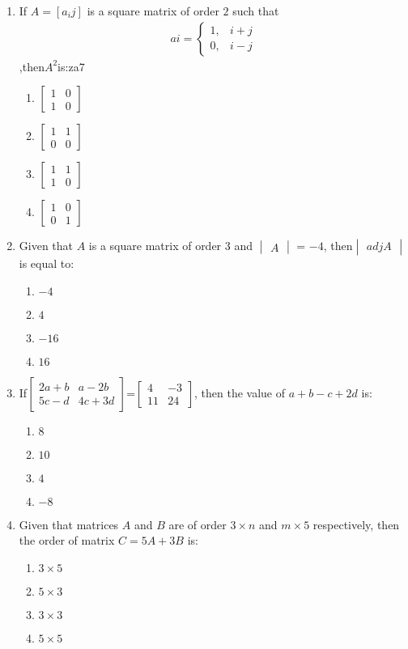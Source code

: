 \documentclass{article}
\providecommand{\myvec}[1]{\begin{bmatrix}#1\end{bmatrix}}
\providecommand{\mydet}[1]{\begin{vmatrix}#1\end{vmatrix}}
\begin{document}
\begin{enumerate}
    \item If $A = [a_{i}{j}]$ is a square matrix of order $2$ such that 
	    \begin{align*}
		    a{i}=\begin{cases}
			    1, &  i + j \\
			    0, &  i - j
		    \end{cases}
	    \end{align*},then$A^2$is:za7

    \begin{enumerate}
        \item $\myvec{1&0\\1 &0}$
        \item $ \myvec{1&1\\0&0}$
        \item $\myvec{1&1\\1&0}$
        \item $\myvec{1&0\\0&1}$
    \end{enumerate}

    \item Given that $A$ is a square matrix of order $3$ and $\mydet{A}$ = $-4$, then$\mydet{adjA}$ is equal to:
    \begin{enumerate}
        \item $-4$
        \item $4$
        \item $-16$
        \item $16$
    \end{enumerate}
    
    \item If$\myvec{2a+b & a-2b \\5c-d & 4c+3d}$=$\myvec{4&-3 \\11&24}$,
    then the value of $a + b - c + 2d$ is:
    \begin{enumerate}
        \item  $8$
        \item $10$
        \item $4$ 
        \item $-8$
    \end{enumerate}

  \item Given that matrices $A$ and $B$ are of order $3 \times n$ and $m \times 5$ respectively, then the order of matrix $C = 5A + 3B$ is:
    \begin{enumerate}
        \item $ 3 \times 5$ 
        \item $ 5 \times 3$ 
        \item $ 3 \times 3$ 
        \item $ 5 \times 5$
    \end{enumerate}


\end{enumerate}
\end{document}
